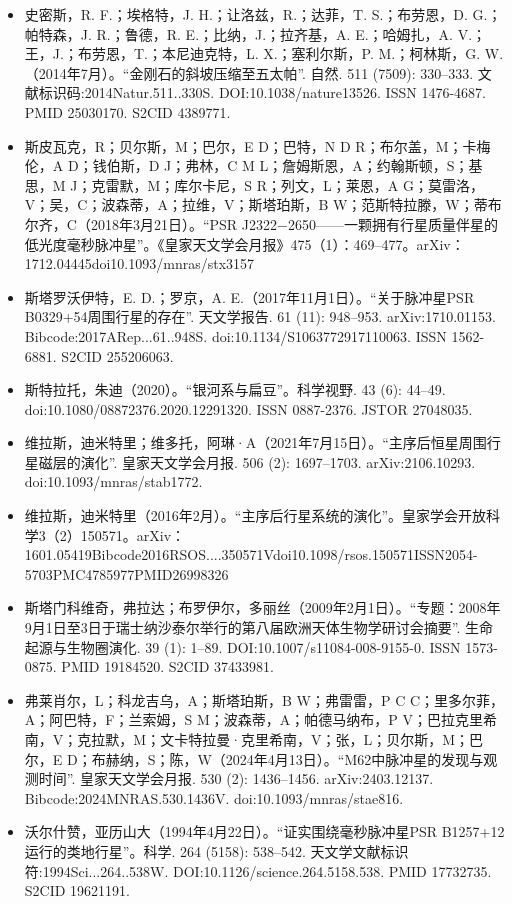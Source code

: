 \begin{itemize}
\item 史密斯，R. F.；埃格特，J. H.；让洛兹，R.；达菲，T. S.；布劳恩，D. G.；帕特森，J. R.；鲁德，R. E.；比纳，J.；拉齐基，A. E.；哈姆扎，A. V.；王，J.；布劳恩，T.；本尼迪克特，L. X.；塞利尔斯，P. M.；柯林斯，G. W.（2014年7月）。“金刚石的斜坡压缩至五太帕”. 自然. 511 (7509): 330–333. 文献标识码:2014Natur.511..330S. DOI:10.1038/nature13526. ISSN 1476-4687. PMID 25030170. S2CID 4389771.
\item 斯皮瓦克，R；贝尔斯，M；巴尔，E D；巴特，N D R；布尔盖，M；卡梅伦，A D；钱伯斯，D J；弗林，C M L；詹姆斯恩，A；约翰斯顿，S；基思，M J；克雷默，M；库尔卡尼，S R；列文，L；莱恩，A G；莫雷洛，V；吴，C；波森蒂，A；拉维，V；斯塔珀斯，B W；范斯特拉滕，W；蒂布尔齐，C（2018年3月21日）。“PSR J2322−2650——一颗拥有行星质量伴星的低光度毫秒脉冲星”。《皇家天文学会月报》475（1）：469–477。arXiv：1712.04445doi10.1093/mnras/stx3157
\item 斯塔罗沃伊特，E. D.；罗京，A. E.（2017年11月1日）。“关于脉冲星PSR B0329+54周围行星的存在”. 天文学报告. 61 (11): 948–953. arXiv:1710.01153. Bibcode:2017ARep...61..948S. doi:10.1134/S1063772917110063. ISSN 1562-6881. S2CID 255206063.
\item 斯特拉托，朱迪（2020）。“银河系与扁豆”。科学视野. 43 (6): 44–49. doi:10.1080/08872376.2020.12291320. ISSN 0887-2376. JSTOR 27048035.
\item 维拉斯，迪米特里；维多托，阿琳·A（2021年7月15日）。“主序后恒星周围行星磁层的演化”. 皇家天文学会月报. 506 (2): 1697–1703. arXiv:2106.10293. doi:10.1093/mnras/stab1772.
\item 维拉斯，迪米特里（2016年2月）。“主序后行星系统的演化”。皇家学会开放科学3（2）150571。arXiv：1601.05419Bibcode2016RSOS....350571Vdoi10.1098/rsos.150571ISSN2054-5703PMC4785977PMID26998326
\item 斯塔门科维奇，弗拉达；布罗伊尔，多丽丝（2009年2月1日）。“专题：2008年9月1日至3日于瑞士纳沙泰尔举行的第八届欧洲天体生物学研讨会摘要”. 生命起源与生物圈演化. 39 (1): 1–89. DOI:10.1007/s11084-008-9155-0. ISSN 1573-0875. PMID 19184520. S2CID 37433981.
\item 弗莱肖尔，L；科龙吉乌，A；斯塔珀斯，B W；弗雷雷，P C C；里多尔菲，A；阿巴特，F；兰索姆，S M；波森蒂，A；帕德马纳布，P V；巴拉克里希南，V；克拉默，M；文卡特拉曼·克里希南，V；张，L；贝尔斯，M；巴尔，E D；布赫纳，S；陈，W（2024年4月13日）。“M62中脉冲星的发现与观测时间”. 皇家天文学会月报. 530 (2): 1436–1456. arXiv:2403.12137. Bibcode:2024MNRAS.530.1436V. doi:10.1093/mnras/stae816.
\item 沃尔什赞，亚历山大（1994年4月22日）。“证实围绕毫秒脉冲星PSR B1257+12运行的类地行星”。科学. 264 (5158): 538–542. 天文学文献标识符:1994Sci...264..538W. DOI:10.1126/science.264.5158.538. PMID 17732735. S2CID 19621191.

\end{itemize}
